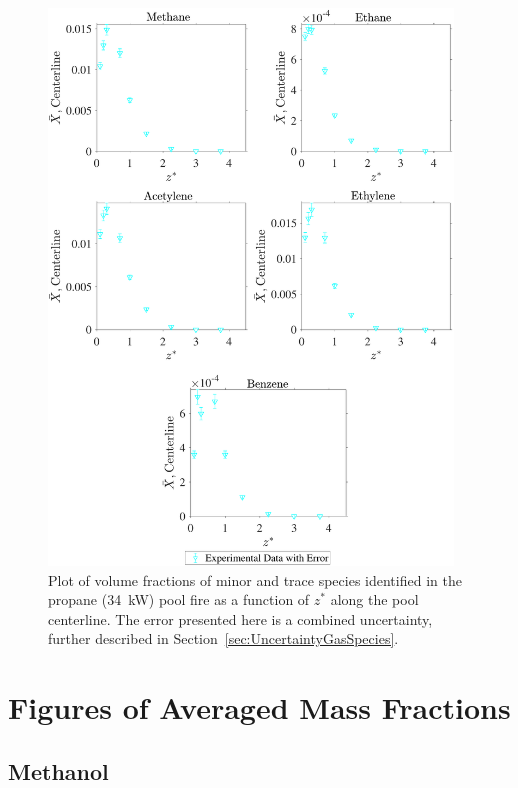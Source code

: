 \documentclass[12pt]{article}
\begin{document}
\begin{figure}[!h]
	\centering
\includegraphics[width=10.75cm,keepaspectratio]{Propane 34KW_Inter_MOL_FRAC_Plot.pdf}
	\caption[Volume fractions of minor and trace species in the propane (34 kW) plume]{Plot of volume fractions of minor and trace species identified in the propane (34~kW) pool fire as a function of $z^{*}$ along the pool centerline. The error presented here is a combined uncertainty, further described in Section~\ref{sec:UncertaintyGasSpecies}.}
	\label{fig:Propane20kW_VOL_Frac_Inter}
\end{figure}
\clearpage

\section{Figures of Averaged Mass Fractions}\label{sec:Mix_Frac_Figs}

\subsection{Methanol}
\label{ssec:Methanol_ALL_Mix_Frac}
\end{document}
